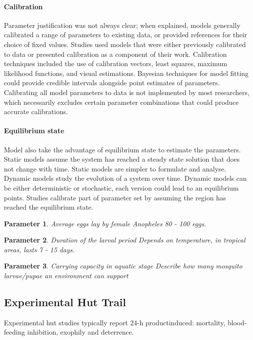 \documentclass[a4paper, 12pt, twoside]{article}
\newtheorem{parameter}{Parameter}
\begin{document}
\paragraph{Calibration}%
\label{par:calibration}
Parameter justification was not always clear\cite{Gurarie2007,Arifin2011a,NiazArifin2013}; when explained, models generally calibrated a range of parameters to existing data, or provided references for their choice of fixed values.
Studies used models that were either previously calibrated to data or presented calibration as a component of their work.
Calibration techniques included the use of calibration vectors, least squares, maximum likelihood functions, and visual estimations.
Bayesian techniques for model fitting could provide credible intervals alongside point estimates of parameters.
Calibrating all model parameters to data is not implemented by most researchers, which necessarily excludes certain parameter combinations that could produce accurate calibrations.

\paragraph{Equilibrium state}%
\label{par:equilibrium_state}
Model also take the advantage of equilibrium state to estimate the parameters\cite{Alves2021}.
Static models assume the system has reached a steady state solution that does not change with time.
Static models are simpler to formulate and analyse.
Dynamic models study the evolution of a system over time.
Dynamic models can be either deterministic or stochastic, each version could lead to an equilibrium points.
Studies calibrate part of parameter set by assuming the region has reached the equilibrium state.

\begin{parameter}
  {Average eggs lay by female \textit{Anopheles}}
80 - 100 eggs.
\end{parameter}

\begin{parameter}
  {Duration of the larval period} 
Depends on temperature, in tropical areas, lasts 7 - 15 days.\cite{bayoh_lindsay_2003}
\end{parameter}

\begin{parameter}
  {Carrying capacity in aquatic stage}
Describe how many mosquito larvae/pupae an environment can support
\end{parameter}

\subsection{Experimental Hut Trail}
Experimental hut studies typically report 24-h productinduced: mortality, blood-feeding inhibition, exophily and deterrence.
\end{document}
